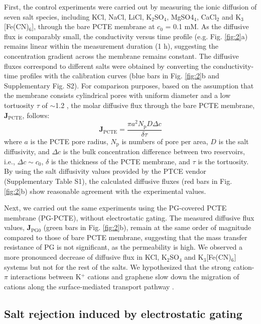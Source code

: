 \documentclass[journal=langd5,email=true, hyperref=true, keywords=false]{achemso}
\newcommand{\Fig}{Fig.}
\begin{document}
First, the control experiments were carried out by measuring the ionic
diffusion of seven salt species, including KCl, NaCl, LiCl,
K$_{2}$SO$_{4}$, MgSO4$_{4}$, CaCl$_{2}$ and K$_{3}$[Fe(CN)$_{6}$],
through the bare PCTE membrane at $c_{0}$ = 0.1 mM. As the diffusive
flux is comparably small, the conductivity versus time profile
(e.g. \Fig{} \ref{fig:2}a) remains linear within the measurement
duration (1 h), suggesting the concentration gradient across the
membrane remains constant. The diffusive fluxes
correspond to different salts were obtained by converting the
conductivity-time profiles with the calibration curves (blue bars in
\Fig{} \ref{fig:2}b and Supplementary \Fig{} S2). For comparison
purposes, based on the assumption that the membrane consists
cylindrical pores with uniform diameter and a low tortuosity $\tau$ of
$\sim{}$1.2 \cite{O_Hern_2012}, the molar diffusive flux through the
bare PCTE membrane, $\boldsymbol{J}_{\mathrm{PCTE}}$, follows:
  \begin{equation}
    \label{eq:j-pcte}
    \boldsymbol{J}_{\mathrm{PCTE}} = \frac{\pi a^{2} N_{\mathrm{p}} D \Delta c}{\delta \tau}
  \end{equation}
where $a$ is the PCTE pore radius, $N_{\mathrm{p}}$ is numbers of pore
per area, $D$ is the salt diffusivity, and $\Delta c$ is the bulk
concentration difference between two reservoirs, i.e.,
$\Delta c \sim c_{0}$, $\delta$ is the thickness of the PCTE membrane,
and $\tau$ is the tortuosity. By using the salt diffusivity values
provided by the PTCE vendor (Supplementary Table S1), the
calculated diffusive fluxes (red bars in \Fig{} \ref{fig:2}b) show
reasonable agreement with the experimental values.

Next, we carried out the same experiments using the PG-covered PCTE
membrane (PG-PCTE), without electrostatic gating. The measured
diffusive flux values, $\boldsymbol{J}_{\mathrm{PG0}}$ (green bars in
\Fig{} \ref{fig:2}b), remain at the same order of magnitude compared
to those of bare PCTE membrane, suggesting that the mass transfer
resistance of PG is not significant, as the permeability is high. We
observed a more pronounced decrease of diffusive flux in KCl,
K$_{2}$SO$_{4}$ and K$_{3}$[Fe(CN)$_{6}$] systems but not for the rest
of the salts. We hypothesized that the strong cation-$\pi$ interactions
between K$^{+}$ cations and graphene slow down the migration of cations
along the surface-mediated transport pathway \cite{Sun_2014}.

\subsection{Salt rejection induced by electrostatic gating}
\label{sec:res-2}
\end{document}
